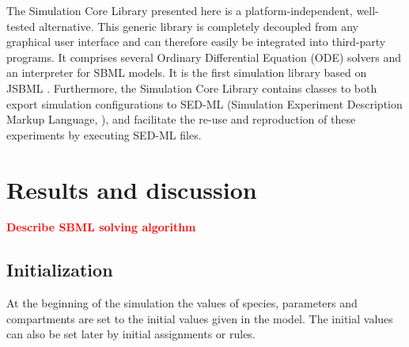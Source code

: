 \documentclass[10pt]{bmc_article}
\newenvironment{bmcformat}{\baselineskip20pt\sloppy\setboolean{publ}{false}}{\baselineskip20pt\sloppy}
\newcommand{\TODO}[1]{\textcolor{red}{\textbf{#1}}}
\begin{document}
\begin{bmcformat}
%
%
%
%
The Simulation Core Library presented here is a platform-independent,
well-tested alternative.
This generic library is completely decoupled from any graphical user interface
and can therefore easily be integrated into third-party programs.
It comprises several Ordinary Differential Equation (ODE)
solvers and an interpreter for SBML models. It is the first simulation library
based on JSBML \cite{Draeger2011b}. 
%
%
Furthermore, the Simulation Core Library contains classes to both export
simulation configurations to SED-ML (Simulation Experiment Description Markup Language,
\cite{Waltemath2011}), and facilitate the re-use and reproduction of these
experiments by executing SED-ML files.

\section{Results and discussion}

\TODO{Describe SBML solving algorithm}

\subsection{Initialization}
At the beginning of the simulation the values of species, parameters and compartments are set to the initial values given in the model. The initial values can also be set later by initial assignments or rules.


\end{bmcformat}
\end{document}
